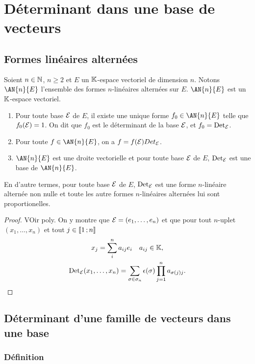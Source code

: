 \section{Déterminant dans une base de vecteurs}

\subsection{Formes linéaires alternées}

Soient $n\in \mathbb{N}$, $n\geq 2$ et $E$ un $\mathbb{K}$-espace vectoriel de dimension $n$. Notons $\AN{n}{E}$ l'ensemble des formes $n$-linéaires alternées sur $E$. $\AN{n}{E}$ est un $\mathbb{K}$-espace vectoriel.

\begin{theo}
\label{theo:detbases}
  \begin{enumerate}
  \item Pour toute base $\mathcal{E}$ de $E$, il existe une unique forme $f_0 \in \AN{n}{E}$ telle que $f_0(\mathcal{E})=1$. On dit que $f_0$ est le déterminant de la base $\mathcal{E}$, et $f_0=\operatorname{Det}_{\mathcal{E}}$.
  \item Pour toute $f \in \AN{n}{E}$, on a $f=f(\mathcal{E}) Det_{\mathcal{E}}$.
  \item $\AN{n}{E}$ est une droite vectorielle et pour toute base $\mathcal{E}$ de $E$, $\operatorname{Det}_{\mathcal{E}}$ est une base de $\AN{n}{E}$.
  \end{enumerate}
\end{theo}

En d'autre termes, pour toute base $\mathcal{E}$ de $E$, $\operatorname{Det}_{\mathcal{E}}$ est une forme $n$-linéaire alternée non nulle et toute les autre formes $n$-linéaires alternées lui sont proportionelles.

\begin{proof}
  VOir poly. On y montre que $\mathcal{E}=(e_1, \ldots, e_n)$ et que pour tout $n$-uplet $(x_1, \ldots, x_n)$ et tout $j \in \mathopen{\llbracket}1\mathclose{}\mathpunct{};n\mathclose{\rrbracket}$
  \begin{gather}
    x_j=\sum_{i}^n a_{ij}e_i \quad a_{ij} \in \mathbb{K}, \\
    \operatorname{Det}_{\mathcal{E}}(x_1, \ldots, x_n) =\sum_{\sigma \in \sigma_n}\epsilon(\sigma) \prod_{j=1}^n a_{\sigma(j)j}.
  \end{gather}
\end{proof}

\subsection{Déterminant d'une famille de vecteurs dans une base}

\subsubsection{Définition}

